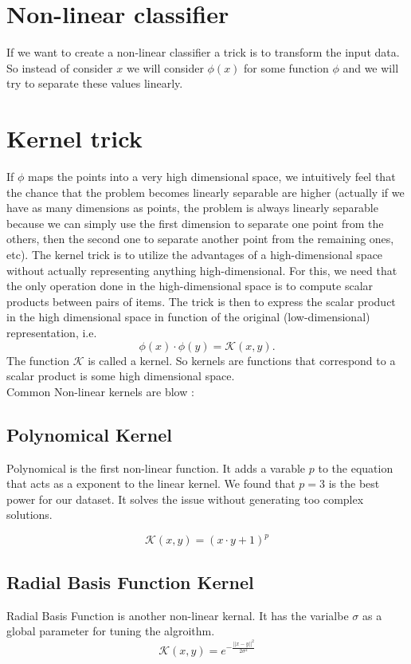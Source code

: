 \documentclass{article}
\begin{document}
\section{Non-linear classifier}
If we want to create a non-linear classifier a trick is to transform the input data. So instead of consider $x$ we will consider $\phi(x)$ for some function $\phi$ and we will try to separate these values linearly.
\pagebreak
\section{Kernel trick}
If $\phi$ maps the points into a very high dimensional space, we intuitively feel that the chance that the problem becomes linearly separable are higher (actually if we have as many dimensions as points, the problem is always linearly separable because we can simply use the first dimension to separate one point from the others, then the second one to separate another point from the remaining ones, etc). The kernel trick is to utilize the advantages of a high-dimensional space without actually representing anything high-dimensional. For this, we need that the only operation done in the high-dimensional space is to compute scalar products between pairs of items. The trick is then to express the scalar product in the high dimensional space in function of the original (low-dimensional) representation, i.e.
$$\phi(x) \cdot \phi(y) = \mathcal{K}(x,y).$$
The function $\mathcal{K}$ is called a kernel. So kernels are functions that correspond to a scalar product is some high dimensional space.\\

Common Non-linear kernels are blow :

\subsection{Polynomical Kernel}
Polynomical is the first non-linear function. It adds a varable $p$
to the equation that acts as a exponent to the linear kernel. We found that
$p=3$ is the best power for our dataset. It solves the issue without generating
too complex solutions.

$$\mathcal{K}(x,y) = (x \cdot y + 1)^p$$



\subsection{Radial Basis Function Kernel}
Radial Basis Function is another non-linear kernal. It has the varialbe
$\sigma$ as a global parameter for tuning the algroithm.
$$\mathcal{K}(x,y) = e^{-\frac{||x-y||^2}{2\sigma^2}}$$
\end{document}
